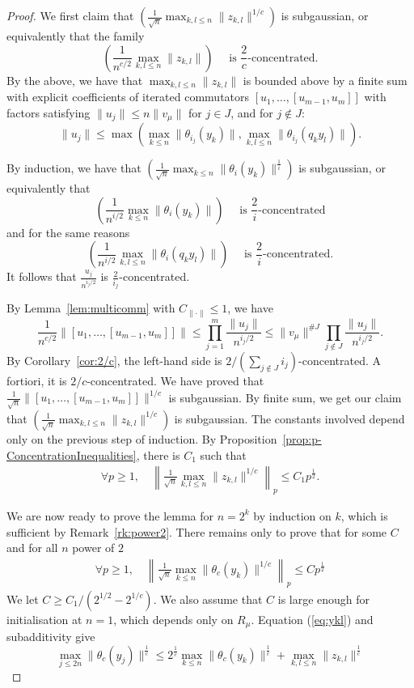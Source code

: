 \documentclass[11pt,leqno]{article}
\theoremstyle{plain}
\theoremstyle{definition}
\theoremstyle{remark}
\numberwithin{equation}{section}
\begin{document}
\begin{proof}
We first claim that $\left(\frac{1}{\sqrt{n}}\max_{k,l\le n}\|z_{k,l}\|^{1/c}\right)$ is subgaussian, or equivalently that the family 
\[
\left(\frac{1}{n^{c/2}}\max_{k,l\le n}\|z_{k,l}\|\right)\quad \textrm{ is }\frac{2}{c}\textrm{-concentrated.}
\]
By the above, we have that $\max_{k,l\le n}\|z_{k,l}\|$ is bounded above by a finite sum with explicit coefficients of iterated commutators $[u_1,\dots,[u_{m-1},u_m]]$ with factors satisfying $\|u_j\|\le n\|v_\mu\|$ for $j \in J$, and for $j\notin J$:
\[
\|u_j\| \le \max \left(\max_{k\le n}\|\theta_{i_j}(y_k)\|, \max_{k,l\le n}\|\theta_{i_j}(q_ky_l)\|  \right).
\]

By induction, we have that
$\left(\frac{1}{\sqrt{n}} \max_{k \le n}\|\theta_i(y_k)\|^{\frac{1}{i}}\right)$ is subgaussian, or equivalently that 
\[
\left(\frac{1}{n^{i/2}}\max_{k \le n} \|\theta_i(y_k)\| \right) \quad \textrm{ is }\frac{2}{i} \textrm{-concentrated}
\]
and for the same reasons
\[
\left(\frac{1}{n^{i/2}}\max_{k,l \le n} \|\theta_i(q_ky_l)\|\right) \quad \textrm{ is }\frac{2}{i} \textrm{-concentrated.}
\]
It follows that $\frac{u_j}{n^{i_j/2}}$ is $\frac{2}{i_j}$-concentrated.

By Lemma~\ref{lem:multicomm} with $C_{\|\cdot\|}\le 1$, we have
\[
\frac{1}{n^{c/2}}\|[u_1,\dots,[u_{m-1},u_m]]\| \le \prod_{j=1}^m \frac{\|u_j\|}{n^{i_j/2}} \le \|v_\mu\|^{\#J}\prod_{j \notin J} \frac{\|u_j\|}{n^{i_j/2}}.
\]
By Corollary~\ref{cor:2/c}, the left-hand side is $2/(\sum_{j \notin J}i_j)$-concentrated. A fortiori, it is $2/c$-concentrated. We have proved that $\frac{1}{\sqrt{n}}\|[u_1,\dots,[u_{m-1},u_m]]\|^{1/c}$ is subgaussian. By finite sum, we get our claim that $\left(\frac{1}{\sqrt{n}}\max_{k,l\le n}\|z_{k,l}\|^{1/c}\right)$ is subgaussian. The constants involved depend only on the previous step of induction. By Proposition~\ref{prop:p-ConcentrationInequalities}, there is $C_1$ such that
\begin{align}\label{eq:Cpz}
\forall p \ge 1, \quad \left\|\frac{1}{\sqrt{n}}\max_{k,l\le n}\|z_{k,l}\|^{1/c}\right\|_p \le C_1 p^{\frac{1}{2}}.
\end{align}

We are now ready to prove the lemma for $n=2^k$ by induction on $k$, which is sufficient by Remark~\ref{rk:power2}. There remains only to prove that for some $C$ and for all $n$ power of $2$
\begin{align}\label{eq:Cpthc}
\forall p \ge 1, \quad \left\|\frac{1}{\sqrt{n}}\max_{k\le n}\|\theta_c(y_k)\|^{1/c}\right\|_p \le C p^{\frac{1}{2}}
\end{align}
We let $C \ge C_1/(2^{1/2}-2^{1/c})$. We also assume that $C$ is large enough for initialisation at $n=1$, which depends only on $R_\mu$.
Equation (\ref{eq:ykl}) and subadditivity give
\[
\max_{j\le 2n} \|\theta_c(y_j)\|^{\frac{1}{c}} \le 2^{\frac{1}{c}}\max_{k\le n}\|\theta_c(y_k)\|^{\frac{1}{c}}+\max_{k,l\le n}\|z_{k,l}\|^{\frac{1}{c}}
\]


\end{proof}
\end{document}
